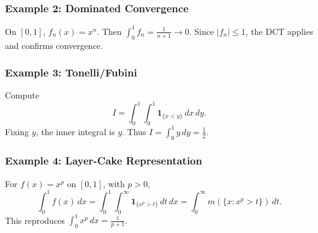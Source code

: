 \subsubsection*{Example 2: Dominated Convergence}
On $[0,1]$, $f_n(x) = x^n$. Then $\int_0^1 f_n = \tfrac{1}{n+1} \to 0$. Since $|f_n| \le 1$, the DCT applies and confirms convergence.

\subsubsection*{Example 3: Tonelli/Fubini}
Compute
\[
I = \int_0^1 \int_0^1 \mathbf{1}_{\{x<y\}} \, dx \, dy.
\]
Fixing $y$, the inner integral is $y$. Thus $I = \int_0^1 y\,dy = \tfrac{1}{2}$.

\subsubsection*{Example 4: Layer-Cake Representation}
For $f(x) = x^p$ on $[0,1]$, with $p>0$,
\[
\int_0^1 f(x)\,dx = \int_0^1 \int_0^\infty \mathbf{1}_{\{x^p>t\}}\,dt\,dx = \int_0^\infty m(\{x: x^p>t\})\,dt.
\]
This reproduces $\int_0^1 x^p\,dx = \frac{1}{p+1}$.